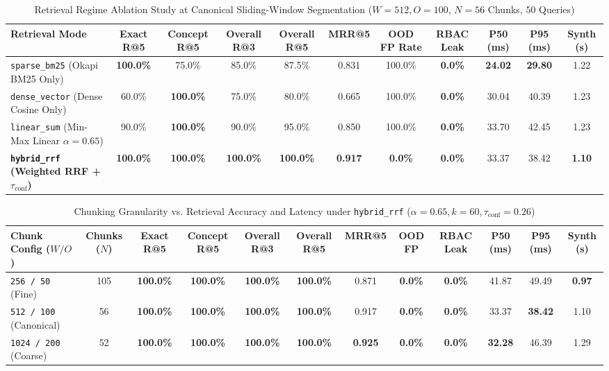 \documentclass[conference]{IEEEtran}
\begin{document}
\begin{table}[t]
\centering
\caption{Retrieval Regime Ablation Study at Canonical Sliding-Window Segmentation ($W = 512, O = 100$, $N = 56$ Chunks, $50$ Queries)}
\label{tab:regime_ablation}
\begin{tabular}{lcccccccccc}
\toprule
\textbf{Retrieval Mode} & \textbf{Exact R@5} & \textbf{Concept R@5} & \textbf{Overall R@3} & \textbf{Overall R@5} & \textbf{MRR@5} & \textbf{OOD FP Rate} & \textbf{RBAC Leak} & \textbf{P50 (ms)} & \textbf{P95 (ms)} & \textbf{Synth (s)} \\
\midrule
\texttt{sparse\_bm25} (Okapi BM25 Only) & \textbf{100.0\%} & 75.0\% & 85.0\% & 87.5\% & 0.831 & 100.0\% & \textbf{0.0\%} & \textbf{24.02} & \textbf{29.80} & 1.22 \\
\texttt{dense\_vector} (Dense Cosine Only) & 60.0\% & \textbf{100.0\%} & 75.0\% & 80.0\% & 0.665 & 100.0\% & \textbf{0.0\%} & 30.04 & 40.39 & 1.23 \\
\texttt{linear\_sum} (Min-Max Linear $\alpha=0.65$) & 90.0\% & \textbf{100.0\%} & 90.0\% & 95.0\% & 0.850 & 100.0\% & \textbf{0.0\%} & 33.70 & 42.45 & 1.23 \\
\textbf{\texttt{hybrid\_rrf} (Weighted RRF + $\tau_{\text{conf}}$)} & \textbf{100.0\%} & \textbf{100.0\%} & \textbf{100.0\%} & \textbf{100.0\%} & \textbf{0.917} & \textbf{0.0\%} & \textbf{0.0\%} & 33.37 & 38.42 & \textbf{1.10} \\
\bottomrule
\end{tabular}
\end{table}

\begin{table}[t]
\centering
\caption{Chunking Granularity vs. Retrieval Accuracy and Latency under \texttt{hybrid\_rrf} ($\alpha = 0.65, k = 60, \tau_{\text{conf}} = 0.26$)}
\label{tab:chunk_ablation}
\begin{tabular}{lccccccccccc}
\toprule
\textbf{Chunk Config ($W/O$)} & \textbf{Chunks ($N$)} & \textbf{Exact R@5} & \textbf{Concept R@5} & \textbf{Overall R@3} & \textbf{Overall R@5} & \textbf{MRR@5} & \textbf{OOD FP} & \textbf{RBAC Leak} & \textbf{P50 (ms)} & \textbf{P95 (ms)} & \textbf{Synth (s)} \\
\midrule
\texttt{256 / 50} (Fine) & 105 & \textbf{100.0\%} & \textbf{100.0\%} & \textbf{100.0\%} & \textbf{100.0\%} & 0.871 & \textbf{0.0\%} & \textbf{0.0\%} & 41.87 & 49.49 & \textbf{0.97} \\
\texttt{512 / 100} (Canonical) & 56 & \textbf{100.0\%} & \textbf{100.0\%} & \textbf{100.0\%} & \textbf{100.0\%} & 0.917 & \textbf{0.0\%} & \textbf{0.0\%} & 33.37 & \textbf{38.42} & 1.10 \\
\texttt{1024 / 200} (Coarse) & 52 & \textbf{100.0\%} & \textbf{100.0\%} & \textbf{100.0\%} & \textbf{100.0\%} & \textbf{0.925} & \textbf{0.0\%} & \textbf{0.0\%} & \textbf{32.28} & 46.39 & 1.29 \\
\bottomrule
\end{tabular}
\end{table}
\end{document}
